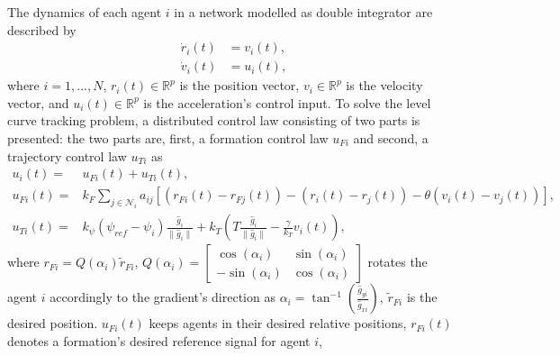 The dynamics of each agent $i$ in a network modelled as double integrator are described by
\begin{align} \label{eq:lct_di}
\dot{r}_i(t)& = v_i(t), \nonumber \\
\dot{v}_i(t) & = u_i(t),
\end{align}
where %
$i=1,...,N$, $r_i(t) \in \mathbb{R}^{p}$ is the position vector, $v_i \in \mathbb{R}^{p}$ is the velocity vector, and $u_i(t) \in \mathbb{R}^{p}$ is the acceleration's  control input. 
To solve the level curve tracking problem,  a distributed control law consisting of two parts is presented: the two parts are, first, a formation control law $u_{Fi}$ and second, a trajectory control law $u_{Ti}$ as 
\begin{align} \label{eq:lct_di_dcl}
u_i(t) = & u_{Fi}(t) +u_{Ti}(t), \nonumber \\
u_{Fi}(t) = & k_F \sum_{j \in \mathcal{N}_i} a_{ij} [ (r_{Fi}(t)-r_{Fj}(t)) -(r_i(t)-r_j(t)) - \theta (v_i(t)-v_j(t)) ], \nonumber \\
u_{Ti}(t)= & k_{\psi}(\psi_{ref}-\psi_i)\frac{\hat{g}_i}{\|\hat{g}_i\|}+k_T\left(T\frac{\hat{g}_i}{\|\hat{g}_i\|}-\frac{\gamma}{k_T} v_i(t) \right),
\end{align}
where
$r_{Fi}=Q(\alpha _i)\tilde{r}_{Fi}$, 
$
Q(\alpha_i)=
\begin{bmatrix}
\cos(\alpha_i) & \sin(\alpha_i)\\
-\sin(\alpha_i) &  \cos(\alpha_i)
\end{bmatrix}
$
 rotates the agent $i$ accordingly to the gradient's direction as 
$\alpha_i= \tan^{-1}\left(\frac{\hat{g}_{yi}}{\hat{g}_{xi}}\right)$, $\tilde{r}_{Fi}$ is the desired position. 
$u_{Fi}(t)$ keeps agents in their desired relative positions, %
$r_{Fi}(t)$ denotes a formation's desired reference signal for agent $i$, 
